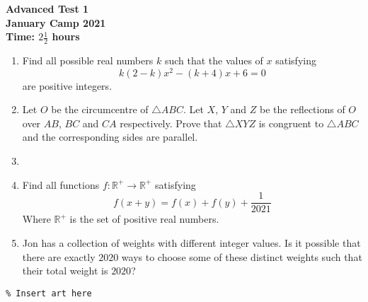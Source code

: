 \documentclass{article}
\begin{document}
\thispagestyle{empty}

\begin{center}
  \textbf{\Large Advanced Test 1}
  \\ \vspace{1em}
  \textbf{\large January Camp 2021}
  \\ \vspace{1em}
  \textbf{\large Time: $2\frac{1}{2}$ hours}
\end{center}

\vspace{24pt}

\begin{enumerate}[1.]

\item %
Find all possible real numbers $k$ such that the values of $x$ satisfying
$$k(2 - k)x^2 - (k + 4)x + 6 = 0$$
are positive integers.


\item %
Let $O$ be the circumcentre of $\triangle ABC$. Let $X$, $Y$ and $Z$ be the reflections of $O$ over $AB$, $BC$ and $CA$ respectively. Prove that $\triangle XYZ$ is congruent to $\triangle ABC$ and the corresponding sides are parallel.


\item %


\item %
Find all functions $f: \mathbb{R}^+ \rightarrow \mathbb{R}^+$ satisfying 
$$f(x + y) = f(x) + f(y) + \frac{1}{2021} $$
Where $\mathbb{R}^+$ is the set of positive real numbers. 

\item %
Jon has a collection of weights with different integer values. Is it possible that there are exactly $2020$ ways to choose some of these distinct weights such that their total weight is $2020$?

\end{enumerate}


\vfill
\begin{center} \begin{verbatim}
% Insert art here
\end{verbatim} \end{center}
\end{document}
